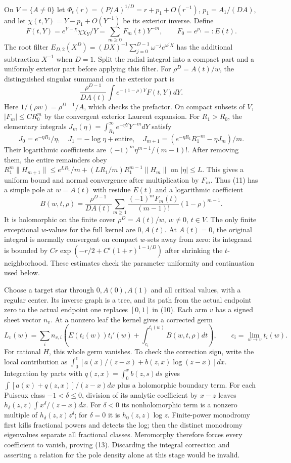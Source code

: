 \documentclass[11pt]{article}
\begin{document}
On $V=\{A\ne0\}$ let
$\Phi_t(r)=(P/A)^{1/D}=r+p_1+O(r^{-1})$, $p_1=A_1/(DA)$,
and let $\chi(t,Y)=Y-p_1+O(Y^{-1})$ be its exterior inverse. Define
\[
 F(t,Y)=e^{Y-\chi}\chi\chi_Y/Y=\sum_{m\ge0}F_m(t)Y^{-m},
 \qquad F_0=e^{p_1}=:E(t).
\]
The root filter
$E_{D,2}(X^D)=(DX)^{-1}\sum_{j=0}^{D-1}\omega^{-j}e^{\omega^jX}$
has the additional subtraction $X^{-1}$ when $D=1$.
Split the radial integral into a compact part and a uniformly exterior
part before applying this filter. For $\rho^D=A(t)/w$, the distinguished
singular summand on the exterior part is
\[
 \frac{\rho^{D-1}}{DA(t)}\int e^{-(1-\rho)Y}F(t,Y)dY .       \tag{11}
\]
Here $1/(\rho w)=\rho^{D-1}/A$, which checks the prefactor.
On compact subsets of $V$, $|F_m|\le C R_0^m$ by the convergent exterior
Laurent expansion. For $R_1>R_0$, the elementary integrals
$J_m(\eta)=\int_{R_1}^\infty e^{-\eta Y}Y^{-m}dY$ satisfy
\[
 J_0=e^{-\eta R_1}/\eta,\quad J_1=-\log\eta+\text{entire},\quad
 J_{m+1}=(e^{-\eta R_1}R_1^{-m}-\eta J_m)/m.
\]
Their logarithmic coefficients are $(-1)^m\eta^{m-1}/(m-1)!$.
After removing them, the entire remainders obey
$R_1^m\|H_{m+1}\|\le e^{LR_1}/m+(LR_1/m)R_1^{m-1}\|H_m\|$
on $|\eta|\le L$. This gives a uniform bound and normal convergence
after multiplication by $F_m$. Thus (11) has a simple pole at
$w=A(t)$ with residue $E(t)$ and a logarithmic coefficient
\[
 B(w,t,\rho)=\frac{\rho^{D-1}}{DA(t)}
   \sum_{m\ge1}\frac{(-1)^mF_m(t)}{(m-1)!}(1-\rho)^{m-1}.    \tag{12}
\]
It is holomorphic on the finite cover $\rho^D=A(t)/w$, $w\ne0$, $t\in V$.
The only finite exceptional $w$-values for the full kernel are $0,A(t)$.
At $A(t)=0$, the original integral is normally convergent on compact
$w$-sets away from zero: its integrand is bounded by
$C r\exp(-r/2+C'(1+r)^{1-1/D})$ after shrinking the $t$-neighborhood.
These estimates check the parameter uniformity and continuation used below.

Choose a target star through $0,A(0),A(1)$ and all critical values,
with a regular center. Its inverse graph is a tree, and its path from
the actual endpoint zero to the actual endpoint one replaces $[0,1]$
in (10). Each arm $v$ has a signed sheet vector $n_v$.
At a nonzero leaf the kernel gives a corrected germ
\[
 L_v(w)=\sum_i n_{v,i}\left(
     E(t_i(w))t_i'(w)+\int_{c_i}^{t_i(w)}B(w,t,\rho)dt\right),\qquad
 c_i=\lim_{w\to v}t_i(w).                                 \tag{13}
\]
For rational $H$, this whole germ vanishes. To check the correction sign,
write the local contribution as
$\int_0^\epsilon[a(x)/(z-x)+b(z,x)\log(z-x)]dx$.
Integration by parts with $q(z,x)=\int_0^x b(z,s)ds$ gives
$\int[a(x)+q(z,x)]/(z-x)dx$ plus a holomorphic boundary term.
For each Puiseux class $-1<\delta\le0$, division of its analytic coefficient
by $x-z$ leaves $h_\delta(z,z)\int x^\delta/(z-x)dx$.
For $\delta<0$ its nonholomorphic term is a nonzero multiple of
$h_\delta(z,z)z^\delta$; for $\delta=0$ it is $h_0(z,z)\log z$.
Finite-power monodromy first kills fractional powers and detects the log;
then the distinct monodromy eigenvalues separate all fractional classes.
Meromorphy therefore forces every coefficient to vanish, proving (13).
Discarding the integral correction and asserting a relation for the pole
density alone at this stage would be invalid.
\end{document}
